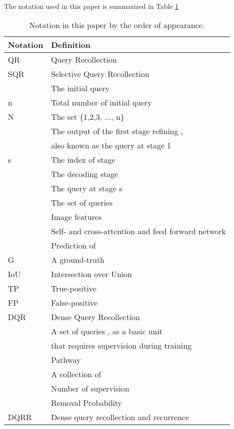 \documentclass[10pt,twocolumn,letterpaper]{article}
\begin{document}
The notation used in this paper is summarized in Table \ref{tab:notation}
\begin{table}[t]
    \centering
    \caption{Notation in this paper by the order of appearance.}
    \begin{tabular}{@{}ll@{}}
    \toprule[1pt]
    Notation & Definition \\ 
    \midrule
    QR      &   Query Recollection   \\
    SQR    &  Selective Query Recollection   \\
        &   The  initial query      \\
    n    &   Total number of initial query  \\
    N    & The set \{1,2,3, ..., n\}\\
     & The output of the first stage refining ,\\
           & also known as the  query at stage 1 \\
    s & The index of stage\\
     & The  decoding stage\\
     & The  query at stage s \\
     & The set of queries \\
     & Image features\\
     & Self- and cross-attention and feed forward network\\
     & Prediction of \\
    G & A ground-truth \\
    IoU & Intersection over Union\\
    TP & True-positive\\
    FP & False-positive\\
    DQR & Dense Query Recollection\\
     & A set of queries , as a basic unit\\
     &  that requires supervision during training\\
     & Pathway\\
     & A collection of \\
     & Number of supervision\\
     & Removal Probability\\
    DQRR & Dense query recollection and recurrence  \\
    \bottomrule[1pt]
    \end{tabular}
    \label{tab:notation}
\end{table}
\end{document}
